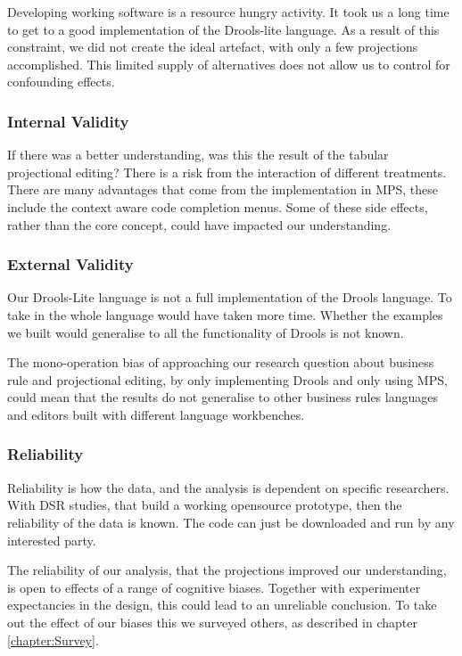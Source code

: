 Developing working software is a resource hungry activity. 
It took us a long time to get to a good implementation of the Drools-lite language.
As a result of this constraint, we did not create the ideal artefact, with only a few projections accomplished.
This limited supply of alternatives does not allow us to control for confounding effects.

\subsubsection{Internal Validity}
If there was a better understanding, was this the result of the tabular projectional editing?
There is a risk from the interaction of different treatments.
There are many advantages that come from the implementation in MPS, these include the context aware code completion menus.
Some of these side effects, rather than the core concept, could have impacted our understanding.

\subsubsection{External Validity}
Our Drools-Lite language is not a full implementation of the Drools language.
To take in the whole language would have taken more time.
Whether the examples we built would generalise to all the functionality of Drools is not known.

The mono-operation bias of approaching our research question about business rule and projectional editing, by only implementing Drools and only using MPS, could mean that the results do not generalise to other business rules languages and editors built with different language workbenches. 

\subsubsection{Reliability}
Reliability is how the data, and the analysis is dependent on specific researchers.
With DSR studies, that build a working opensource prototype, then the reliability of the data is known.
The code can just be downloaded and run by any interested party.  

The reliability of our analysis, that the projections improved our understanding, is open to effects of a range of cognitive biases.
Together with experimenter expectancies in the design, this could lead to an unreliable conclusion. 
To take out the effect of our biases this we surveyed others, as described in chapter \ref{chapter:Survey}.
